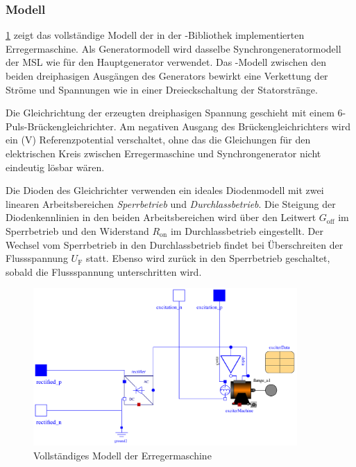 \subsubsection{Modell}\label{modell-erregermaschine}

\cref{fig:Erregermaschine} zeigt das vollständige Modell der in der -Bibliothek implementierten Erregermaschine. Als Generatormodell wird dasselbe Synchrongeneratormodell der MSL wie für den Hauptgenerator verwendet. Das -Modell zwischen den beiden dreiphasigen Ausgängen des Generators bewirkt eine Verkettung der Ströme und Spannungen wie in einer Dreieckschaltung der Statorstränge.

Die Gleichrichtung der erzeugten dreiphasigen Spannung geschieht mit einem 6-Puls-Brückengleichrichter. Am negativen Ausgang des Brückengleichrichters wird ein (\unit[0]{V}) Referenzpotential verschaltet, ohne das die Gleichungen für den elektrischen Kreis zwischen Erregermaschine und Synchrongenerator nicht eindeutig lösbar wären.

Die Dioden des Gleichrichter verwenden ein ideales Diodenmodell mit zwei linearen Arbeitsbereichen \emph{Sperrbetrieb} und \emph{Durchlassbetrieb}. Die Steigung der Diodenkennlinien in den beiden Arbeitsbereichen wird über den Leitwert \(G_{\mathrm{off}}\) im Sperrbetrieb und den Widerstand \(R_{\mathrm{on}}\) im Durchlassbetrieb eingestellt. Der Wechsel vom Sperrbetrieb in den Durchlassbetrieb findet bei Überschreiten der Flussspannung \(U_{\mathrm{F}}\) statt. Ebenso wird zurück in den Sperrbetrieb geschaltet, sobald die Flussspannung unterschritten wird.

\begin{figure}
    \centering
    \includegraphics[height=6cm]{Bilder/SM_Erreger.pdf}
    \caption{Vollständiges Modell der Erregermaschine}
    \label{fig:Erregermaschine}
\end{figure}

